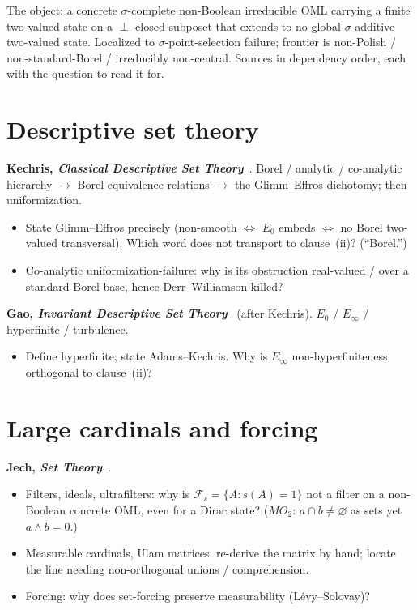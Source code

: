 \noindent The object: a concrete $\sigma$-complete non-Boolean irreducible OML carrying a
finite two-valued state on a $\perp$-closed subposet that extends to no global
$\sigma$-additive two-valued state. Localized to $\sigma$-point-selection failure; frontier
is non-Polish / non-standard-Borel / irreducibly non-central. Sources in dependency order,
each with the question to read it for.

\section{Descriptive set theory}

\noindent\textbf{Kechris, \emph{Classical Descriptive Set Theory}}~\cite{Kechris1995}.
Borel / analytic / co-analytic hierarchy $\to$ Borel equivalence relations $\to$ the
Glimm--Effros dichotomy; then uniformization.
\begin{itemize}[leftmargin=*]
  \item State Glimm--Effros precisely (non-smooth $\iff$ $E_0$ embeds $\iff$ no Borel
    two-valued transversal). Which word does not transport to clause~(ii)? (``Borel.'')
  \item Co-analytic uniformization-failure: why is its obstruction real-valued / over a
    standard-Borel base, hence Derr--Williamson-killed?
\end{itemize}

\noindent\textbf{Gao, \emph{Invariant Descriptive Set Theory}}~\cite{Gao2009} (after
Kechris). $E_0$ / $E_\infty$ / hyperfinite / turbulence.
\begin{itemize}[leftmargin=*]
  \item Define hyperfinite; state Adams--Kechris. Why is $E_\infty$ non-hyperfiniteness
    orthogonal to clause~(ii)?
\end{itemize}

\section{Large cardinals and forcing}

\noindent\textbf{Jech, \emph{Set Theory}}~\cite{Jech2003}.
\begin{itemize}[leftmargin=*]
  \item Filters, ideals, ultrafilters: why is $\mathcal{F}_s = \{A : s(A)=1\}$ not a filter
    on a non-Boolean concrete OML, even for a Dirac state? ($MO_2$:
    $a\cap b\neq\varnothing$ as sets yet $a\wedge b = 0$.)
  \item Measurable cardinals, Ulam matrices: re-derive the matrix by hand; locate the line
    needing non-orthogonal unions / comprehension.
  \item Forcing: why does set-forcing preserve measurability (L\'evy--Solovay)?
\end{itemize}

